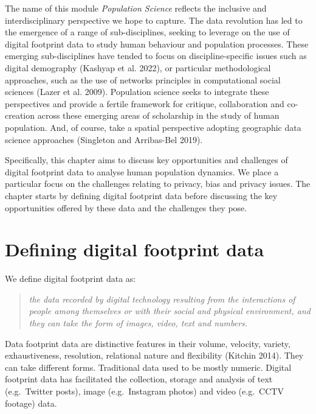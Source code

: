 \documentclass[
  letterpaper,
  DIV=11,
  numbers=noendperiod]{scrreprt}
\begin{document}
The name of this module \emph{Population Science} reflects the inclusive
and interdisciplinary perspective we hope to capture. The data
revolution has led to the emergence of a range of sub-disciplines,
seeking to leverage on the use of digital footprint data to study human
behaviour and population processes. These emerging sub-disciplines have
tended to focus on discipline-specific issues such as digital demography
(Kashyap et al. 2022), or particular methodological approaches, such as
the use of networks principles in computational social sciences (Lazer
et al. 2009). Population science seeks to integrate these perspectives
and provide a fertile framework for critique, collaboration and
co-creation across these emerging areas of scholarship in the study of
human population. And, of course, take a spatial perspective adopting
geographic data science approaches (Singleton and Arribas-Bel 2019).

Specifically, this chapter aims to discuss key opportunities and
challenges of digital footprint data to analyse human population
dynamics. We place a particular focus on the challenges relating to
privacy, bias and privacy issues. The chapter starts by defining digital
footprint data before discussing the key opportunities offered by these
data and the challenges they pose.

\hypertarget{defining-digital-footprint-data}{%
\section{Defining digital footprint
data}\label{defining-digital-footprint-data}}

We define digital footprint data as:

\begin{quote}
\emph{the data recorded by digital technology resulting from the
interactions of people among themselves or with their social and
physical environment, and they can take the form of images, video, text
and numbers.}
\end{quote}

Data footprint data are distinctive features in their volume, velocity,
variety, exhaustiveness, resolution, relational nature and flexibility
(Kitchin 2014). They can take different forms. Traditional data used to
be mostly numeric. Digital footprint data has facilitated the
collection, storage and analysis of text (e.g.~Twitter posts), image
(e.g.~Instagram photos) and video (e.g.~CCTV footage) data.
\end{document}
